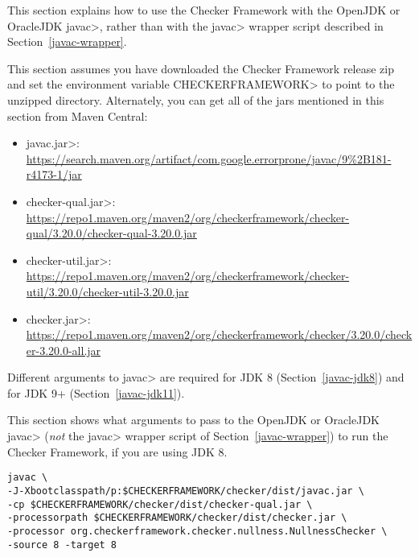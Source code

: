 
This section explains how to use the Checker Framework with the OpenJDK or
OracleJDK \<javac>, rather than with the \<javac> wrapper script described in
Section~\ref{javac-wrapper}.

This
section assumes you have downloaded the Checker Framework release zip and set
the environment variable \<CHECKERFRAMEWORK> to point to the unzipped directory.
Alternately, you can get all of the jars mentioned in this section from Maven Central:

\begin{itemize}
\item \<javac.jar>: \url{https://search.maven.org/artifact/com.google.errorprone/javac/9%2B181-r4173-1/jar}
\item \<checker-qual.jar>: \url{https://repo1.maven.org/maven2/org/checkerframework/checker-qual/3.20.0/checker-qual-3.20.0.jar}
\item \<checker-util.jar>: \url{https://repo1.maven.org/maven2/org/checkerframework/checker-util/3.20.0/checker-util-3.20.0.jar}
\item \<checker.jar>: \url{https://repo1.maven.org/maven2/org/checkerframework/checker/3.20.0/checker-3.20.0-all.jar}
\end{itemize}

Different arguments to \<javac> are required for JDK 8
(Section~\ref{javac-jdk8}) and for JDK 9+ (Section~\ref{javac-jdk11}).



This section shows what arguments to pass to the OpenJDK or OracleJDK
\<javac> (\emph{not} the \<javac> wrapper script of
Section~\ref{javac-wrapper}) to run the Checker
Framework, if you are using JDK 8.

\begin{Verbatim}
javac \
-J-Xbootclasspath/p:$CHECKERFRAMEWORK/checker/dist/javac.jar \
-cp $CHECKERFRAMEWORK/checker/dist/checker-qual.jar \
-processorpath $CHECKERFRAMEWORK/checker/dist/checker.jar \
-processor org.checkerframework.checker.nullness.NullnessChecker \
-source 8 -target 8
\end{Verbatim}

